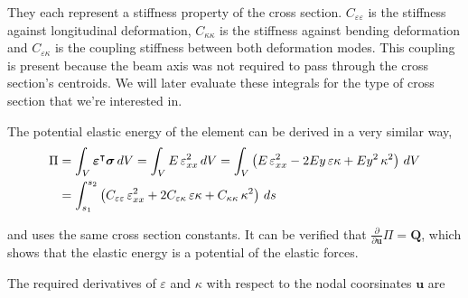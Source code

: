 They each represent a stiffness property of the cross section.
$C_{\varepsilon\varepsilon}$ is the stiffness against longitudinal deformation, $C_{\kappa\kappa}$ is the stiffness against bending deformation and $C_{\varepsilon\kappa}$ is the coupling stiffness between both deformation modes.
This coupling is present because the beam axis was not required to pass through the cross section's centroids.
We will later evaluate these integrals for the type of cross section that we're interested in.

The potential elastic energy of the element can be derived in a very similar way,
%
\begin{align}
\Pi &= \int_{V} \boldsymbol{\varepsilon}^\intercal\boldsymbol{\sigma}\,dV = \int_{V} E\,\varepsilon_{xx}^2\,dV = \int_{V} \left(E\,\varepsilon_{xx}^2 - 2Ey\,\varepsilon\kappa + Ey^2\,\kappa^2\right)\,dV \notag \\
&= \int_{s_1}^{s_2} \left(C_{\varepsilon\varepsilon}\,\varepsilon_{xx}^2 + 2C_{\varepsilon\kappa}\,\varepsilon\kappa + C_{\kappa\kappa}\,\kappa^2\right)\,ds
\end{align}

and uses the same cross section constants.
It can be verified that $\frac{\partial}{\partial\boldsymbol{u}}\Pi = \boldsymbol{Q}$, which shows that the elastic energy is a potential of the elastic forces.

The required derivatives of $\varepsilon$ and $\kappa$ with respect to the nodal coorsinates $\boldsymbol{u}$ are

